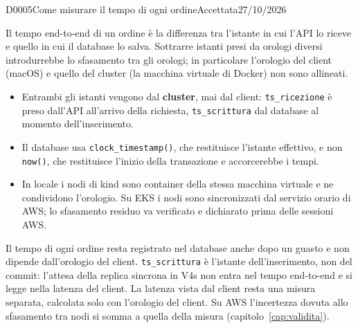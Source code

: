 \begin{decisione}{D0005}{Come misurare il tempo di ogni ordine}{Accettata}{27/10/2026}

\contesto
Il tempo end-to-end di un ordine è la differenza tra l'istante in cui l'API lo riceve e quello in cui il database lo salva. Sottrarre istanti presi da orologi diversi introdurrebbe lo sfasamento tra gli orologi; in particolare l'orologio del client (macOS) e quello del cluster (la macchina virtuale di Docker) non sono allineati.

\scelta
\begin{itemize}
  \item Entrambi gli istanti vengono dal \textbf{cluster}, mai dal client: \texttt{ts\_ricezione} è preso dall'API all'arrivo della richiesta, \texttt{ts\_scrittura} dal database al momento dell'inserimento.
  \item Il database usa \texttt{clock\_timestamp()}, che restituisce l'istante effettivo, e non \texttt{now()}, che restituisce l'inizio della transazione e accorcerebbe i tempi.
  \item In locale i nodi di kind sono container della stessa macchina virtuale e ne condividono l'orologio. Su EKS i nodi sono sincronizzati dal servizio orario di AWS; lo sfasamento residuo va verificato e dichiarato prima delle sessioni AWS.
\end{itemize}

\conseguenze
Il tempo di ogni ordine resta registrato nel database anche dopo un guasto e non dipende dall'orologio del client. \texttt{ts\_scrittura} è l'istante dell'inserimento, non del commit: l'attesa della replica sincrona in V4s non entra nel tempo end-to-end e si legge nella latenza del client. La latenza vista dal client resta una misura separata, calcolata solo con l'orologio del client. Su AWS l'incertezza dovuta allo sfasamento tra nodi si somma a quella della misura (capitolo~\ref{cap:validita}).

\end{decisione}
